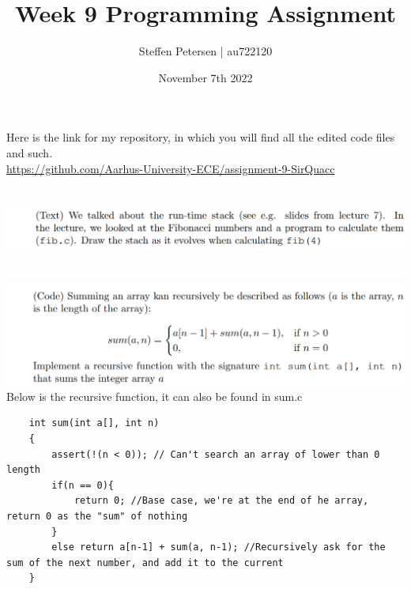 \documentclass{article}
\title{Week 9 Programming Assignment}
\author{Steffen Petersen | au722120}
\date{November 7th 2022}
\begin{document}

\maketitle
\vspace{5pt}
\noindent Here is the link for my repository, in which you will find all the edited code files and such.\\
\url{https://github.com/Aarhus-University-ECE/assignment-9-SirQuacc}
\section{}
\includegraphics[width=\linewidth, keepaspectratio=true]{task1}
\vspace{2pt}\\


\section{}
\includegraphics[width=\linewidth, keepaspectratio=true]{task2}
\vspace{2pt}
Below is the recursive function, it can also be found in sum.c
\begin{lstlisting}
    int sum(int a[], int n)
    {
        assert(!(n < 0)); // Can't search an array of lower than 0 length
        if(n == 0){
            return 0; //Base case, we're at the end of he array, return 0 as the "sum" of nothing
        }
        else return a[n-1] + sum(a, n-1); //Recursively ask for the sum of the next number, and add it to the current
    }
\end{lstlisting}
\pagebreak
\end{document}
